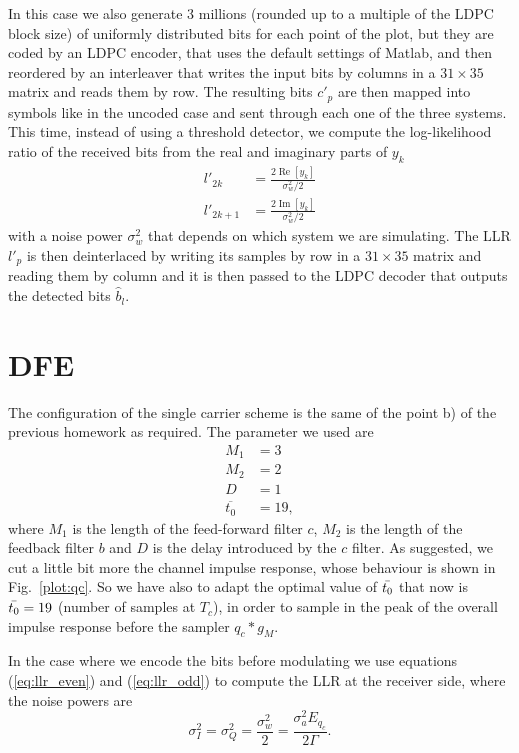 \documentclass[a4paper,oneside]{article}
\renewcommand{\Re}[1]{\operatorname{Re}\left[#1\right]}
\renewcommand{\Im}[1]{\operatorname{Im}\left[#1\right]}
\begin{document}
In this case we also generate 3 millions (rounded up to a multiple of
the LDPC block size) of uniformly distributed bits for each point of
the plot, but they are coded by an LDPC encoder, that uses the default
settings of Matlab, and then reordered by an interleaver that writes
the input bits by columns in a $31\times35$ matrix and reads them by
row. The resulting bits $c'_p$ are then mapped into symbols like in
the uncoded case and sent through each one of the three systems.  This
time, instead of using a threshold detector, we compute the
log-likelihood ratio of the received bits from the real and imaginary
parts of $y_k$
\begin{align}
  l'_{2k} &= \frac{2\Re{y_k}}{\sigma^2_w/2}
  \label{eq:llr_even} \\
  l'_{2k+1} &= \frac{2\Im{y_k}}{\sigma^2_w/2}
  \label{eq:llr_odd}
\end{align}
with a noise power $\sigma^2_w$ that depends on which system we are
simulating. The LLR $l'_p$ is then deinterlaced by writing its samples
by row in a $31\times35$ matrix and reading them by column and it is
then passed to the LDPC decoder that outputs the detected bits
$\hat{b}_l$.

\section{DFE}
\label{sec:dfe}
The configuration of the single carrier scheme is the same of the point b) of the previous homework as required. The parameter we used are 
\begin{align}
  M_1 &= 3 \\
    M_2 &= 2 \\
    D &= 1 \\
    \overline{t_0} &= 19 ,
\end{align}
where $M_1$ is the length of the feed-forward filter $c$, $M_2$ is the length of the feedback filter $b$ and $D$ is the delay introduced by the $c$ filter.
As suggested, we cut a little bit more the channel impulse response, whose behaviour is shown in Fig.~\ref{plot:qc}. So we have also to adapt the optimal value of $\Bar{t_0}$ that now is $\Bar{t_0} = 19$ (number of samples at $T_c$), in order to sample in the peak of the overall impulse response before the sampler $q_c * g_M$.

In the case where we encode the bits before modulating we use
equations (\ref{eq:llr_even}) and (\ref{eq:llr_odd}) to compute the
LLR at the receiver side, where the noise powers are
\begin{equation}
  \sigma^2_I = \sigma^2_Q = \frac{\sigma^2_w}{2} = \frac{\sigma^2_a E_{q_c}}{2\Gamma} .
\end{equation}
\end{document}

